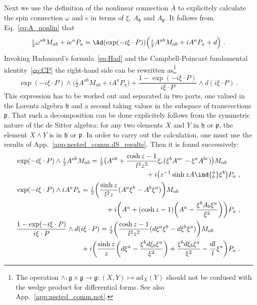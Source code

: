\documentclass[11pt]{article}
\begin{document}
Next we use the definition of the nonlinear connection $\bar{A}$ 
to explicitely calculate the spin connection $\omega$ and $e$ in 
terms of $\xi$, $A_\mathfrak{h}$ and $A_\mathfrak{p}$. It follows 
from Eq.~\eqref{eq:A_nonlin} that
\begin{displaymath}
	\tfrac{i}{2} \omega^{ab} M_{ab} + i e^a P_a
	= \Ad(\exp(-i\xi\cdot P)) \Big( \tfrac{i}{2} A^{ab} M_{ab} + i 
	A^a P_a + d \Big)~.
\end{displaymath}
Invoking Hadamard's formula~\eqref{eq:Had} and the 
Campbell-Poincar\'e fundamental identity~\eqref{eq:CP} the 
right-hand side can be rewritten as\footnote{The operation 
	$\wedge : \mathfrak{g} \times \mathfrak{g} \to \mathfrak{g} : 
	(X,Y) \mapsto \mathrm{ad}_X (Y)$ should not be confused with 
	the wedge product for differential forms. See also 
	App.~\ref{app:nested_comm.not}.}
\begin{displaymath}
	\exp(-i\xi\cdot P) \wedge \big( \tfrac{i}{2} A^{ab} M_{ab} + i 
	A^a P_a \big) + \frac{1 - \exp(-i\xi\cdot P)}{i\xi\cdot P} 
	\wedge d (i\xi\cdot P)~.
\end{displaymath}
This expression has to be worked out and separated in two parts, 
one valued in the Lorentz algebra $\mathfrak{h}$ and a second 
taking values in the subspace of transvections $\mathfrak{p}$.  
That such a decomposition can be done explicitely follows from 
the symmetric nature of the de Sitter algebra: for any two 
elements $X$ and $Y$ in $\mathfrak{h}$ or $\mathfrak{p}$, the 
element $X \wedge Y$ is in $\mathfrak{h}$ or $\mathfrak{p}$.  In 
order to carry out the calculation, one must use the results of 
App.~\ref{app:nested_comm.dS_results}. Then it is found 
successively:
\begin{gather*}
\begin{multlined}[b][\linewidth-2\multlinegap]
	\exp(-i\xi\cdot P) \wedge \tfrac{i}{2} A^{ab} M_{ab}
	= \tfrac{i}{2} \big( A^{ab} + \frac{\cosh z - 1}{l^2 z^2} 
	\xi_c ( \xi^b A^{ac} - \xi^a A^{bc} ) \big) M_{ab} \\
	+ i \big( z^{-1} \sinh z A\ind{^a_b} \xi^b \big) P_a~,
\end{multlined}
\\
\begin{multlined}[b][\linewidth-2\multlinegap]
	\exp(-i\xi\cdot P) \wedge i A^a P_a = \tfrac{i}{2} \bigg( 
	\frac{\sinh z}{l^2 z} (A^a \xi^b - A^b \xi^a ) \bigg) M_{ab} 
	\\
	+ i \bigg( A^a + (\cosh z - 1) \bigg(A^a - \frac{\xi^b A_b 
		\xi^a}{\xi^2}  \bigg) \bigg) P_a~,
\end{multlined}
\\
\begin{multlined}[b][\linewidth-2\multlinegap]
	\frac{1 - \exp(-i\xi\cdot P)}{i\xi\cdot P} \wedge d (i\xi\cdot 
	P) = \tfrac{i}{2} \bigg( \frac{\cosh z - 1}{l^2 z^2} (d\xi^a 
	\xi^b - d\xi^b \xi^a) \bigg) M_{ab} \\
	+ i \bigg( \frac{\sinh z}{z} \bigg( d\xi^a - \frac{\xi^b 
		d\xi_b \xi^a}{\xi^2} \bigg) + \frac{\xi^b d\xi_b 
		\xi^a}{\xi^2} - \frac{dl}{l} \xi^a \bigg) P_a~.
\end{multlined}
\end{gather*}
\end{document}
